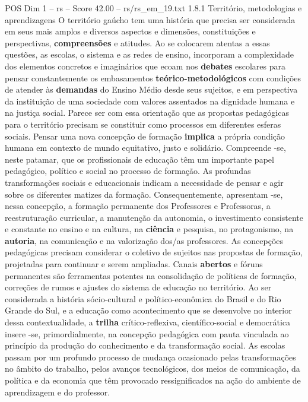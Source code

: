 \begin{textsample}{POS Dim 1 – rs – Score 42.00 – rs/rs\_em\_19.txt}  \label{ex:f1_pos_208}
1.8.1 Território, metodologias e aprendizagens O território gaúcho tem uma história que precisa ser considerada em seus mais amplos e diversos aspectos e dimensões, constituições e perspectivas, \textbf{compreensões} e atitudes.
Ao se colocarem atentas a essas questões, as escolas, o sistema e as redes de ensino, incorporam a complexidade dos elementos concretos e imaginários que ecoam nos \textbf{debates} escolares para pensar constantemente os embasamentos \textbf{teórico-metodológicos} com condições de atender às \textbf{demandas} do Ensino Médio desde seus sujeitos, e em perspectiva da instituição de uma sociedade com valores assentados na dignidade humana e na justiça social.
Parece ser com essa orientação que as propostas pedagógicas para o território precisam se constituir como processos em diferentes esferas sociais.
Pensar uma nova concepção de formação \textbf{implica} a própria condição humana em contexto de mundo equitativo, justo e solidário.
Compreende -se, neste patamar, que os profissionais de educação têm um importante papel pedagógico, político e social no processo de formação.
As profundas transformações sociais e educacionais indicam a necessidade de pensar e agir sobre os diferentes matizes da formação.
Consequentemente, apresentam -se, nessa concepção, a formação permanente dos Professores e Professoras, a reestruturação curricular, a manutenção da autonomia, o investimento consistente e constante no ensino e na cultura, na \textbf{ciência} e pesquisa, no protagonismo, na \textbf{autoria}, na comunicação e na valorização dos/as professores.
As concepções pedagógicas precisam considerar o coletivo de sujeitos nas propostas de formação, projetadas para continuar e serem ampliadas.
Canais \textbf{abertos} e fóruns permanentes são ferramentas potentes na consolidação de políticas de formação, correções de rumos e ajustes do sistema de educação no território.
Ao ser considerada a história sócio-cultural e político-econômica do Brasil e do Rio Grande do Sul, e a educação como acontecimento que se desenvolve no interior dessa contextualidade, a \textbf{trilha} crítico-reflexiva, científico-social e democrática insere -se, primordialmente, na concepção pedagógica com pauta vinculada ao princípio da produção do conhecimento e da transformação social.
As escolas passam por um profundo processo de mudança ocasionado pelas transformações no âmbito do trabalho, pelos avanços tecnológicos, dos meios de comunicação, da política e da economia que têm provocado ressignificados na ação do ambiente de aprendizagem e do professor.

\end{textsample}
